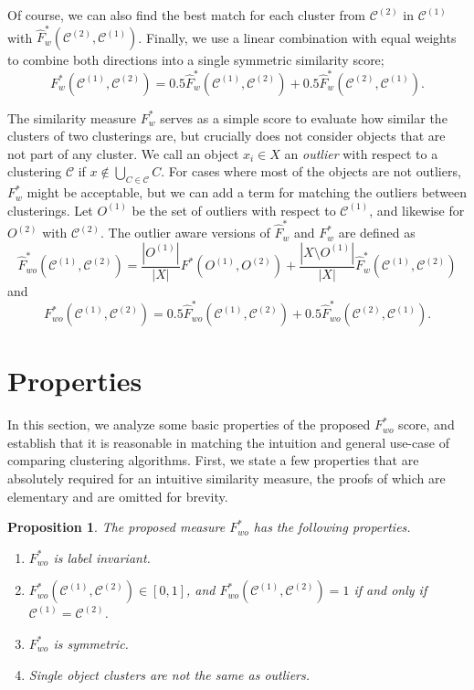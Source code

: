 \documentclass[11pt]{article}
\newtheorem{prop}[thm]{Proposition}
\theoremstyle{remark}
\newcommand\cC{\mathcal C}
\newcommand\cCone{\mathcal{C}^{(1)}}
\newcommand\cCtwo{\mathcal{C}^{(2)}}
\begin{document}
Of course, we can also find the best match for each cluster from $\cCtwo$ in $\cCone$ with $\hat{F}^*_w(\cCtwo, \cCone)$.
Finally, we use a linear combination with equal weights to combine both directions into a single symmetric similarity score;
\begin{equation*}
    F^*_w(\cCone, \cCtwo) = 0.5 \hat{F}^{*}_w(\cCone, \cCtwo) + 0.5\hat{F}^{*}_w(\cCtwo, \cCone).
\end{equation*}

The similarity measure $F^*_w$ serves as a simple score to evaluate how similar the clusters of two clusterings are, but crucially does not consider objects that are not part of any cluster.
We call an object $x_i \in X$ an \textit{outlier} with respect to a clustering $\cC$ if $x \not \in \bigcup_{C \in \cC} C$.
For cases where most of the objects are not outliers, $F^*_w$ might be acceptable, but we can add a term for matching the outliers between clusterings.
Let $O^{(1)}$ be the set of outliers with respect to $\cCone$, and likewise for $O^{(2)}$ with $\cCtwo$.
The outlier aware versions of $\hat{F}^*_w$ and $F^*_w$ are defined as
\begin{equation*}
    \hat{F}^{*}_{wo}(\cCone, \cCtwo) = \frac{|O^{(1)}|}{|X|} F^*(O^{(1)}, O^{(2)}) + \frac{|X \setminus O^{(1)}|}{|X|} \hat{F}^{*}_w(\cCone, \cCtwo)
\end{equation*}
and
\begin{equation*}
    F^*_{wo}(\cCone, \cCtwo) = 0.5\hat{F}^*_{wo}(\cCone, \cCtwo) + 0.5\hat{F}^*_{wo}(\cCtwo, \cCone).
\end{equation*}

\section{Properties}
In this section, we analyze some basic properties of the proposed $F^*_{wo}$ score, and establish that it is reasonable in matching the intuition and general use-case of comparing clustering algorithms.
First, we state a few properties that are absolutely required for an intuitive similarity measure, the proofs of which are elementary and are omitted for brevity.

\begin{prop}
    The proposed measure $F^*_{wo}$ has the following properties.
    \begin{enumerate}
        \item $F^*_{wo}$ is label invariant.
        \item $F^*_{wo}(\cCone, \cCtwo) \in [0,1]$, and $F^*_{wo}(\cCone, \cCtwo) = 1$ if and only if $\cCone = \cCtwo$.
        \item $F^*_{wo}$ is symmetric.
        \item Single object clusters are not the same as outliers.
    \end{enumerate}
\end{prop}
\end{document}
